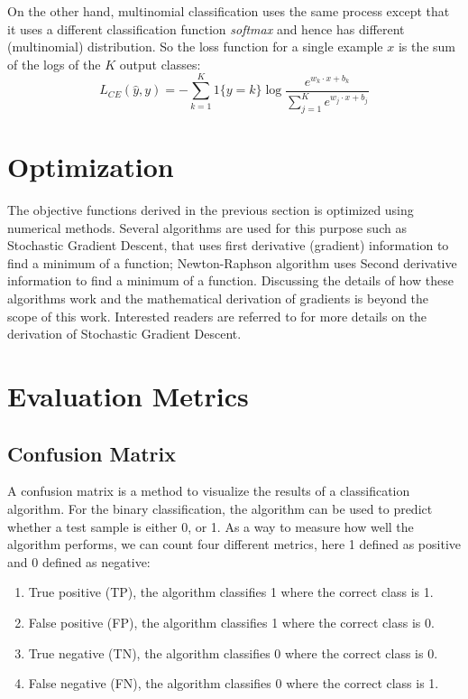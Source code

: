 On the other hand, multinomial classification uses the same process except that it uses a different classification function \emph{softmax} and hence has different (multinomial) distribution. So the loss function for a single example $x$ is the sum of the logs of the $K$ output classes:
$$ L _ { C E } ( \hat { y } , y ) = - \sum _ { k = 1 } ^ { K } 1 \{ y = k \} \log \frac { e ^ { w _ { k } \cdot x + b _ { k } } } { \sum _ { j = 1 } ^ { K } e ^ { w _ { j } \cdot x + b _ { j } } } $$

\section{Optimization}

The objective functions derived in the previous section is optimized using numerical methods. Several algorithms are used for this purpose such as Stochastic Gradient Descent, that uses first derivative (gradient) information to find a minimum of a function; Newton-Raphson algorithm uses Second derivative information to find a minimum of a function. Discussing the details of how these algorithms work and the mathematical derivation of gradients is beyond the scope of this work. Interested readers are referred to \citep{jurafsky2014speech} for more details on the derivation of Stochastic Gradient Descent. 

\section{Evaluation Metrics}
\subsection{Confusion Matrix}

A confusion matrix is a method to visualize the results of a classification algorithm. For the binary classification, the algorithm can be used to predict whether a test sample is either 0, or 1. As a way to measure how well the algorithm performs, we can count four different metrics, here 1 defined as positive and 0 defined as negative:

\begin{enumerate}

\item True positive (TP), the algorithm classifies 1 where the correct class is 1.
\item False positive (FP), the algorithm classifies 1 where the correct class is 0.
\item True negative (TN), the algorithm classifies 0 where the correct class is 0.
\item False negative (FN), the algorithm classifies 0 where the correct class is 1.

\end{enumerate}

